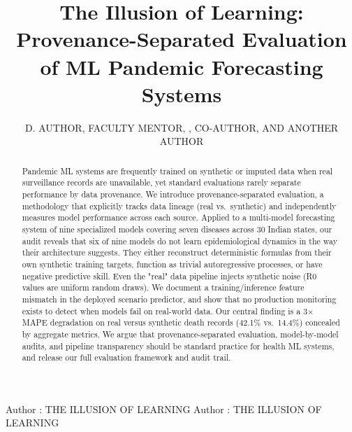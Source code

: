 \documentclass{ieeeaccess}
\begin{document}

\title{The Illusion of Learning: Provenance-Separated Evaluation of ML Pandemic Forecasting Systems}

\author{\uppercase{D. Author},
\uppercase{Faculty Mentor},
,
\uppercase{Co-Author},
AND \uppercase{Another Author}}

\address[1]{Department of Computer Science and Engineering,
Vellore Institute of Technology, Chennai, India
(e-mail: d.author@vit.ac.in)}
\address[2]{Department of Computer Science and Engineering,
Vellore Institute of Technology, Chennai, India
(e-mail: faculty.mentor@vit.ac.in)}


\markboth
{Author \headeretal: THE ILLUSION OF LEARNING}
{Author \headeretal: THE ILLUSION OF LEARNING}


\begin{abstract}
Pandemic ML systems are frequently trained on synthetic or imputed data when real surveillance records are unavailable, yet standard evaluations rarely separate performance by data provenance. We introduce provenance-separated evaluation, a methodology that explicitly tracks data lineage (real vs.\ synthetic) and independently measures model performance across each source. Applied to a multi-model forecasting system of nine specialized models covering seven diseases across 30 Indian states, our audit reveals that six of nine models do not learn epidemiological dynamics in the way their architecture suggests. They either reconstruct deterministic formulas from their own synthetic training targets, function as trivial autoregressive processes, or have negative predictive skill. Even the "real" data pipeline injects synthetic noise (R0 values are uniform random draws). We document a training/inference feature mismatch in the deployed scenario predictor, and show that no production monitoring exists to detect when models fail on real-world data. Our central finding is a 3$\times$ MAPE degradation on real versus synthetic death records (42.1\% vs.\ 14.4\%) concealed by aggregate metrics. We argue that provenance-separated evaluation, model-by-model audits, and pipeline transparency should be standard practice for health ML systems, and release our full evaluation framework and audit trail.
\end{abstract}
\end{document}
